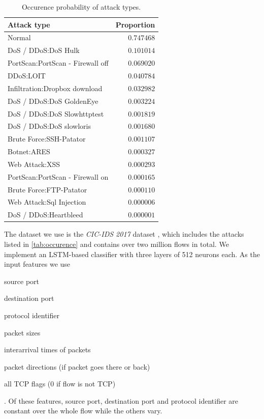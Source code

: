 \documentclass[sigconf,nonacm]{acmart}
\begin{document}
\begin{table}[b]
\caption{Occurence probability of attack types.} \label{tab:occurrence}
\begin{tabular}{l r} \toprule
Attack type & Proportion \\
\midrule
Normal                                                         & $0.747468$ \\
DoS / DDoS:DoS Hulk                                            & $0.101014$ \\
PortScan:PortScan - Firewall off                               & $0.069020$ \\
DDoS:LOIT                                                      & $0.040784$ \\
Infiltration:Dropbox download & $0.032982$ \\
DoS / DDoS:DoS GoldenEye                                       & $0.003224$ \\
DoS / DDoS:DoS Slowhttptest                                    & $0.001819$ \\
DoS / DDoS:DoS slowloris                                       & $0.001680$ \\
Brute Force:SSH-Patator                                        & $0.001107$ \\
Botnet:ARES                                                    & $0.000327$ \\
Web Attack:XSS                                                 & $0.000293$ \\
PortScan:PortScan - Firewall on                                & $0.000165$ \\
Brute Force:FTP-Patator                                        & $0.000110$ \\
Web Attack:Sql Injection                                       & $0.000006$ \\
DoS / DDoS:Heartbleed                                          & $0.000001$ \\
\bottomrule
\end{tabular}
\label{tab:occurence}
\end{table}

The dataset we use is the \textit{CIC-IDS 2017} dataset \cite{sharafaldin_toward_2018}, which includes the attacks listed in \autoref{tab:occurence} and contains over two million flows in total. We implement an LSTM-based classifier with three layers of 512 neurons each. As the input features we use \begin{itemize*}
\item source port
\item destination port
\item protocol identifier
\item packet sizes
\item interarrival times of packets
\item packet directions (if packet goes there or back)
\item all TCP flags (0 if flow is not TCP)
\end{itemize*}. Of these features, source port, destination port and protocol identifier are constant over the whole flow while the others vary.
\end{document}
